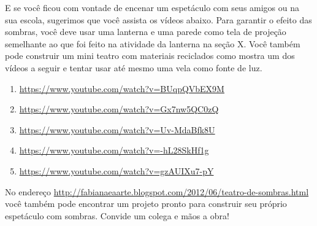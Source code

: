 
E se você ficou com vontade de encenar um espetáculo com seus amigos ou na sua escola, sugerimos que você assista os vídeos abaixo. Para garantir o efeito das sombras, você deve usar uma lanterna e uma parede como tela de projeção semelhante ao que foi feito na atividade da lanterna na seção X. Você também pode construir um mini teatro com materiais reciclados como mostra um dos vídeos a seguir e tentar usar até mesmo uma vela como fonte de luz.
\begin{enumerate}
\item {} 
\url{https://www.youtube.com/watch?v=BUqpQVbEX9M}

\item {} 
\url{https://www.youtube.com/watch?v=Gx7nw5QC0zQ}

\item {} 
\url{https://www.youtube.com/watch?v=Uv-MdaBfk8U}

\item {} 
\url{https://www.youtube.com/watch?v=-hL28SkHf1g}

\item {} 
\url{https://www.youtube.com/watch?v=gzAUIXu7-pY}

\end{enumerate}



No endereço \url{http://fabianaeaarte.blogspot.com/2012/06/teatro-de-sombras.html} você também pode encontrar um projeto pronto para construir seu próprio espetáculo com sombras. Convide um colega e mãos a obra!

